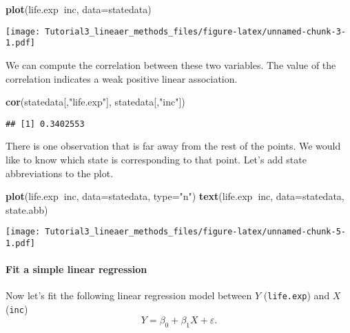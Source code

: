 \documentclass[]{article}
\newenvironment{Shaded}{\begin{snugshade}}{\end{snugshade}}
\newcommand{\KeywordTok}[1]{\textcolor[rgb]{0.13,0.29,0.53}{\textbf{#1}}}
\newcommand{\DataTypeTok}[1]{\textcolor[rgb]{0.13,0.29,0.53}{#1}}
\newcommand{\StringTok}[1]{\textcolor[rgb]{0.31,0.60,0.02}{#1}}
\newcommand{\OperatorTok}[1]{\textcolor[rgb]{0.81,0.36,0.00}{\textbf{#1}}}
\newcommand{\NormalTok}[1]{#1}
\let\oldparagraph\paragraph
\renewcommand{\paragraph}[1]{\oldparagraph{#1}\mbox{}}
\begin{document}
\begin{Shaded}
\begin{Highlighting}[]
\KeywordTok{plot}\NormalTok{(life.exp}\OperatorTok{~}\NormalTok{inc, }\DataTypeTok{data=}\NormalTok{statedata)}
\end{Highlighting}
\end{Shaded}

\texttt{[image: Tutorial3\_lineaer\_methods\_files/figure-latex/unnamed-chunk-3-1.pdf]}

We can compute the correlation between these two variables. The value of
the correlation indicates a weak positive linear association.

\begin{Shaded}
\begin{Highlighting}[]
\KeywordTok{cor}\NormalTok{(statedata[,}\StringTok{"life.exp"}\NormalTok{], statedata[,}\StringTok{"inc"}\NormalTok{])}
\end{Highlighting}
\end{Shaded}

\begin{verbatim}
## [1] 0.3402553
\end{verbatim}

There is one observation that is far away from the rest of the points.
We would like to know which state is corresponding to that point. Let's
add state abbreviations to the plot.

\begin{Shaded}
\begin{Highlighting}[]
\KeywordTok{plot}\NormalTok{(life.exp}\OperatorTok{~}\NormalTok{inc, }\DataTypeTok{data=}\NormalTok{statedata, }\DataTypeTok{type=}\StringTok{"n"}\NormalTok{)}
\KeywordTok{text}\NormalTok{(life.exp}\OperatorTok{~}\NormalTok{inc, }\DataTypeTok{data=}\NormalTok{statedata, state.abb)}
\end{Highlighting}
\end{Shaded}

\texttt{[image: Tutorial3\_lineaer\_methods\_files/figure-latex/unnamed-chunk-5-1.pdf]}

\paragraph{Fit a simple linear
regression}\label{fit-a-simple-linear-regression}

Now let's fit the following linear regression model between \(Y\)
(\texttt{life.exp}) and \(X\) (\texttt{inc})
\[ Y= \beta_0 +\beta_1 X + \varepsilon. \]
\end{document}

